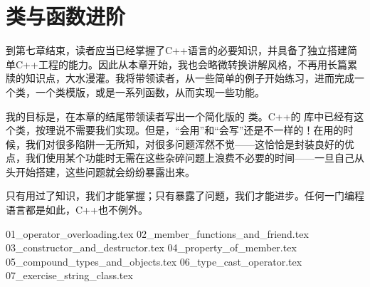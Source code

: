 \chapter{类与函数进阶}
到第七章结束，读者应当已经掌握了C++语言的必要知识，并具备了独立搭建简单C++工程的能力。因此从本章开始，我也会略微转换讲解风格，不再用长篇累牍的知识点，大水漫灌。我将带领读者，从一些简单的例子开始练习，进而完成一个类，一个类模版，或是一系列函数，从而实现一些功能。\par
我的目标是，在本章的结尾带领读者写出一个简化版的 \lstinline@string@ 类。C++的 \lstinline@string@ 库中已经有这个类，按理说不需要我们实现。但是，``会用''和``会写''还是不一样的！在用的时候，我们对很多陷阱一无所知，对很多问题浑然不觉——这恰恰是封装良好的优点，我们使用某个功能时无需在这些杂碎问题上浪费不必要的时间——一旦自己从头开始搭建，这些问题就会纷纷暴露出来。\par
只有用过了知识，我们才能掌握；只有暴露了问题，我们才能进步。任何一门编程语言都是如此，C++也不例外。\par
{01_operator_overloading.tex}
{02_member_functions_and_friend.tex}
{03_constructor_and_destructor.tex}
{04_property_of_member.tex}
{05_compound_types_and_objects.tex}
{06_type_cast_operator.tex}
{07_exercise_string_class.tex}
